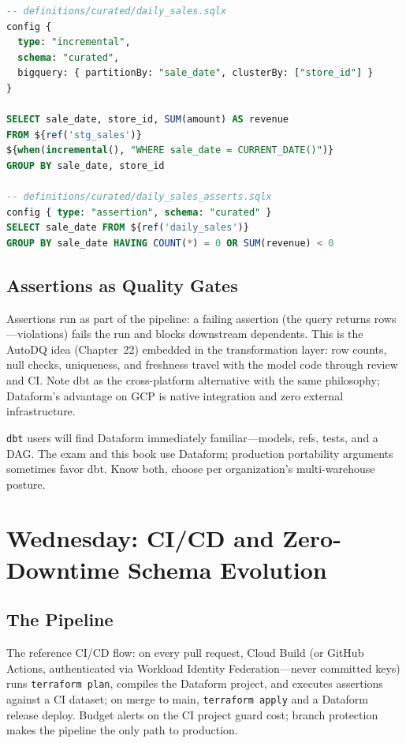 \begin{lstlisting}[language=SQL,caption={A SQLX model with an assertion file.}]
-- definitions/curated/daily_sales.sqlx
config {
  type: "incremental",
  schema: "curated",
  bigquery: { partitionBy: "sale_date", clusterBy: ["store_id"] }
}

SELECT sale_date, store_id, SUM(amount) AS revenue
FROM ${ref('stg_sales')}
${when(incremental(), "WHERE sale_date = CURRENT_DATE()")}
GROUP BY sale_date, store_id

-- definitions/curated/daily_sales_asserts.sqlx
config { type: "assertion", schema: "curated" }
SELECT sale_date FROM ${ref('daily_sales')}
GROUP BY sale_date HAVING COUNT(*) = 0 OR SUM(revenue) < 0
\end{lstlisting}

\subsection{Assertions as Quality Gates}
Assertions run as part of the pipeline: a failing assertion (the query returns rows---violations) fails the run and blocks downstream dependents. This is the AutoDQ idea (Chapter~22) embedded in the transformation layer: row counts, null checks, uniqueness, and freshness travel with the model code through review and CI. Note dbt as the cross-platform alternative with the same philosophy; Dataform's advantage on GCP is native integration and zero external infrastructure.

\begin{notebox}
\texttt{dbt} users will find Dataform immediately familiar---models, refs, tests, and a DAG. The exam and this book use Dataform; production portability arguments sometimes favor dbt. Know both, choose per organization's multi-warehouse posture.
\end{notebox}

\section{Wednesday: CI/CD and Zero-Downtime Schema Evolution}

\subsection{The Pipeline}
The reference CI/CD flow: on every pull request, Cloud Build (or GitHub Actions, authenticated via Workload Identity Federation---never committed keys) runs \texttt{terraform plan}, compiles the Dataform project, and executes assertions against a CI dataset; on merge to main, \texttt{terraform apply} and a Dataform release deploy. Budget alerts on the CI project guard cost; branch protection makes the pipeline the only path to production.

